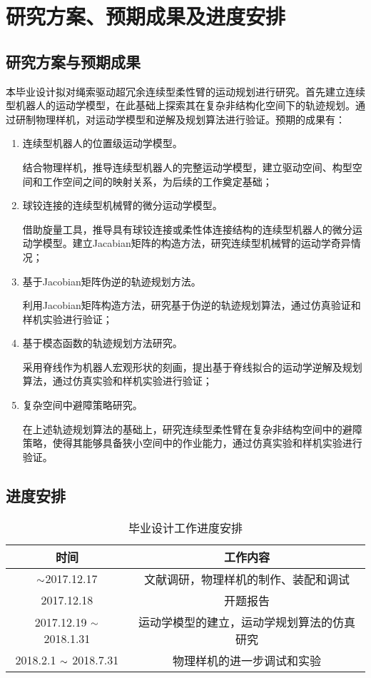 \chapter{研究方案、预期成果及进度安排}

\section{研究方案与预期成果}
本毕业设计拟对绳索驱动超冗余连续型柔性臂的运动规划进行研究。首先建立连续型机器人的运动学模型，在此基础上探索其在复杂非结构化空间下的轨迹规划。通过研制物理样机，对运动学模型和逆解及规划算法进行验证。预期的成果有：
\begin{enumerate}
	\item 连续型机器人的位置级运动学模型。 
	
	结合物理样机，推导连续型机器人的完整运动学模型，建立驱动空间、构型空间和工作空间之间的映射关系，为后续的工作奠定基础；
	
	\item 球铰连接的连续型机械臂的微分运动学模型。
	
	借助旋量工具，推导具有球铰连接或柔性体连接结构的连续型机器人的微分运动学模型。建立Jacabian矩阵的构造方法，研究连续型机械臂的运动学奇异情况；
	
	\item 基于Jacobian矩阵伪逆的轨迹规划方法。
	
	利用Jacobian矩阵构造方法，研究基于伪逆的轨迹规划算法，通过仿真验证和样机实验进行验证；
	
	\item 基于模态函数的轨迹规划方法研究。
	
	采用脊线作为机器人宏观形状的刻画，提出基于脊线拟合的运动学逆解及规划算法，通过仿真实验和样机实验进行验证；
	
	\item 复杂空间中避障策略研究。
	
	在上述轨迹规划算法的基础上，研究连续型柔性臂在复杂非结构空间中的避障策略，使得其能够具备狭小空间中的作业能力，通过仿真实验和样机实验进行验证。
	
\end{enumerate}

\section{进度安排}
\begin{table}
	\centering
	\caption{毕业设计工作进度安排}
	\begin{tabular}{c|c}
		\toprule[1.5pt]
		时间 & 工作内容 \\
		\midrule		
		$\scriptsize{\sim}$2017.12.17 & 文献调研，物理样机的制作、装配和调试 \\
		2017.12.18 & 开题报告 \\
		2017.12.19 $\scriptsize{\sim}$ 2018.1.31 & 运动学模型的建立，运动学规划算法的仿真研究 \\
		2018.2.1 $\scriptsize{\sim}$ 2018.7.31 & 物理样机的进一步调试和实验 \\
		\bottomrule[1.5pt]
	\end{tabular}
\end{table}